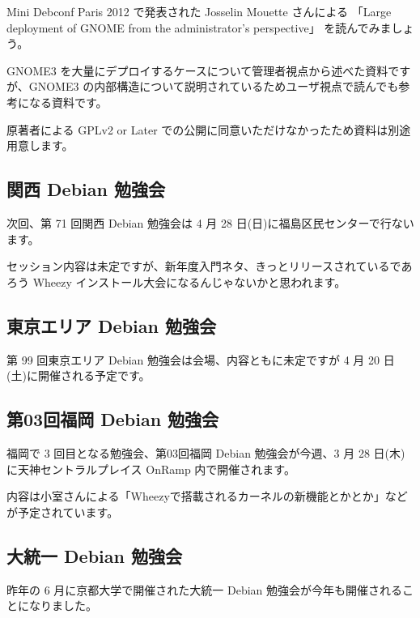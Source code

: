 \documentclass[mingoth,a4paper]{jsarticle}
\begin{document}
\clearpage


Mini Debconf Paris 2012 で発表された Josselin Mouette さんによる 「Large deployment of GNOME from the administrator's perspective」
を読んでみましょう。

GNOME3 を大量にデプロイするケースについて管理者視点から述べた資料ですが、GNOME3 の内部構造について説明されているためユーザ視点で読んでも参考になる資料です。

原著者による GPLv2 or Later での公開に同意いただけなかったため資料は別途用意します。

\clearpage



\subsection{関西 Debian 勉強会}
次回、第 71 回関西 Debian 勉強会は 4 月 28 日(日)に福島区民センターで行ないます。

セッション内容は未定ですが、新年度入門ネタ、きっとリリースされているであろう Wheezy インストール大会になるんじゃないかと思われます。

\subsection{東京エリア Debian 勉強会}
第 99 回東京エリア Debian 勉強会は会場、内容ともに未定ですが 4 月 20 日(土)に開催される予定です。

\subsection{第03回福岡 Debian 勉強会}
福岡で 3 回目となる勉強会、第03回福岡 Debian 勉強会が今週、3 月 28 日(木)に天神セントラルプレイス OnRamp 内で開催されます。

内容は小室さんによる「Wheezyで搭載されるカーネルの新機能とかとか」などが予定されています。

\subsection{大統一 Debian 勉強会}
昨年の 6 月に京都大学で開催された大統一 Debian 勉強会が今年も開催されることになりました。
\end{document}
